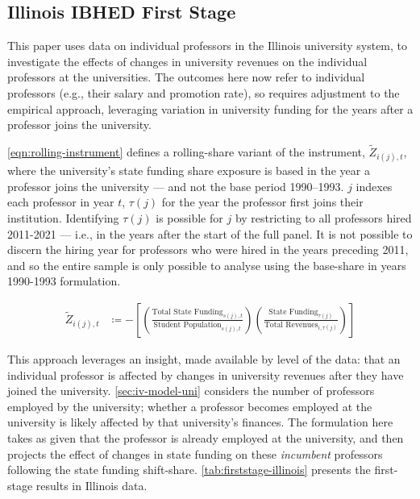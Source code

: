 \newpage
\subsection{Illinois IBHED First Stage}
\label{sec:iv-model-indiv}

This paper uses data on individual professors in the Illinois university system, to investigate the effects of changes in university revenues on the individual professors at the universities.
The outcomes here now refer to individual professors (e.g., their salary and promotion rate), so requires adjustment to the empirical approach, leveraging variation in university funding for the years after a professor joins the university.

\autoref{eqn:rolling-instrument} defines a rolling-share variant of the instrument, $\tilde Z_{i(j),t}$, where the university's state funding share exposure is based in the year a professor joins the university --- and not the base period 1990--1993.
$j$ indexes each professor in year $t$, $\tau(j)$ for the year the professor first joins their institution.
Identifying $\tau(j)$ is possible for $j$ by restricting to all professors hired 2011-2021 --- i.e., in the years after the start of the full panel.
It is not possible to discern the hiring year for professors who  were hired in the years preceding 2011, and so the entire sample is only possible to analyse using the base-share in years 1990-1993 formulation.

\begin{align}
    \label{eqn:rolling-instrument}
    \tilde Z_{i(j),t} &\coloneqq - \left[
    \left( \frac{\text{Total State Funding}_{s(j),t}}{\text{Student Population}_{s(j),t}} \right)
    \left( \frac{\text{State Funding}_{\tau(j)}}{\text{Total Revenues}_{i,\tau(j)}} \right) \right]
\end{align}

This approach leverages an insight, made available by level of the data: that an individual professor is affected by changes in university revenues after they have joined the university.
\autoref{sec:iv-model-uni} considers the number of professors employed by the university; whether a professor becomes employed at the university is likely affected by that university's finances.
The formulation here takes as given that the professor is already employed at the university, and then projects the effect of changes in state funding on these \textit{incumbent} professors following the state funding shift-share.
\autoref{tab:firststage-illinois} presents the first-stage results in Illinois data.

